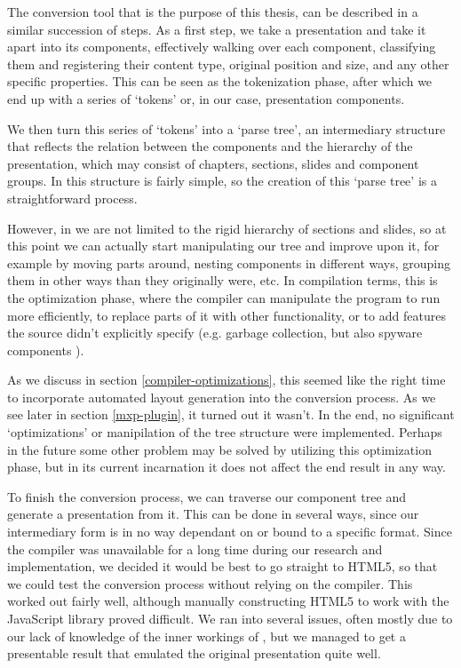    The conversion tool that is the purpose of this thesis, can be described in
   a similar succession of steps. As a first step, we take a \ppt presentation
   and take it apart into its components, effectively walking over each
   component, classifying them and registering their content type, original
   position and size, and any other specific properties. This can be seen as
   the tokenization phase, after which we end up with a series of `tokens' or,
   in our case, presentation components.
  
   We then turn this series of `tokens' into a `parse tree', an intermediary
   structure that reflects the relation between the components and the
   hierarchy of the presentation, which may consist of chapters, sections,
   slides and component groups. In \ppt this structure is fairly simple, so the
   creation of this `parse tree' is a straightforward process.
  
   However, in \mxp we are not limited to the rigid hierarchy of sections and
   slides, so at this point we can actually start manipulating our tree and
   improve upon it, for example by moving parts around, nesting components in
   different ways, grouping them in other ways than they originally were, etc.
   In compilation terms, this is the optimization phase, where the compiler can
   manipulate the program to run more efficiently, to replace parts of it with
   other functionality, or to add features the source didn't explicitly specify
   (e.g. garbage collection, but also spyware components \citep{scahill-1}). 

   As we discuss in section \ref{compiler-optimizations}, this seemed like the
   right time to incorporate automated layout generation into the conversion
   process. As we see later in section \ref{mxp-plugin}, it turned out it
   wasn't. In the end, no significant `optimizations' or manipilation of the
   tree structure were implemented. Perhaps in the future some other problem
   may be solved by utilizing this optimization phase, but in its current
   incarnation it does not affect the end result in any way.
  
   To finish the conversion process, we can traverse our component tree and
   generate a \mxp presentation from it. This can be done in several ways,
   since our intermediary form is in no way dependant on or bound to a specific
   format. Since the \mxp compiler was unavailable for a long time during our
   research and implementation, we decided it would be best to go straight to
   HTML5, so that we could test the conversion process without relying on the
   \mxp compiler. This worked out fairly well, although manually constructing
   HTML5 to work with the \mxp JavaScript library proved difficult. We ran into
   several issues, often mostly due to our lack of knowledge of the inner
   workings of \mxp, but we managed to get a presentable result that emulated
   the original \ppt presentation quite well.

